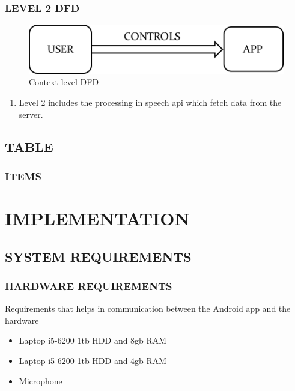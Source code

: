 \documentclass[11pt]{report} %
\begin{document}
\subsection{LEVEL 2 DFD}
\label{subsec:LEVEL 2 DFD}
\begin{figure}[h]
	\centering
	\includegraphics[width=0.5\linewidth]{figures/context_level_DFD.png}
	\caption{Context level DFD}
	\label{fig:Context level DFD}
\end{figure}

\begin{enumerate}
	\item Level 2 includes the processing in speech api which fetch data from the server.
\end{enumerate}

\section{TABLE}
\label{sec:TABLE}

\subsection{ITEMS}
\label{subsec:ITEMS}


\chapter{IMPLEMENTATION}

\section{SYSTEM REQUIREMENTS}
\label{sec:SYSTEM REQUIREMENTS}


\subsection{HARDWARE REQUIREMENTS}
\label{subsec:HARDWARE REQUIREMENTS}
Requirements that helps in communication between the Android app and the hardware
\begin{itemize}
	\item Laptop i5-6200 1tb HDD and 8gb RAM
	\item Laptop i5-6200 1tb HDD and 4gb RAM
	\item Microphone
\end{itemize}
\end{document}
